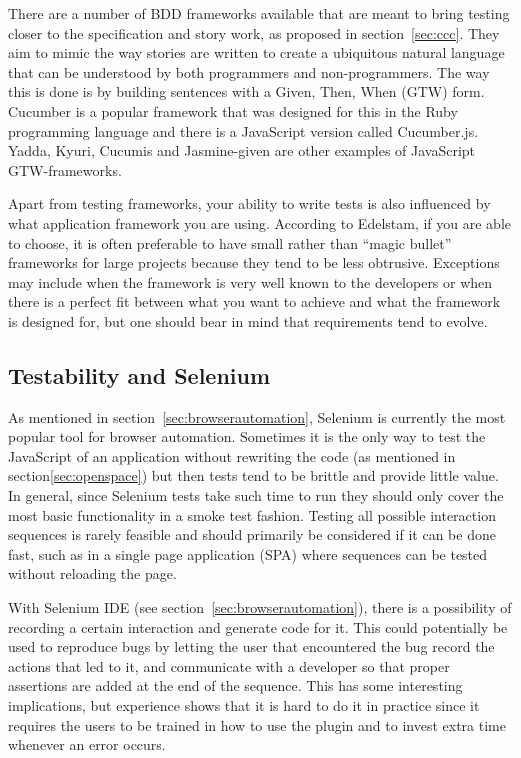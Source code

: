 \documentclass[11pt]{article}
\begin{document}
There are a number of BDD frameworks available that are meant to bring testing closer to the specification and story work, as proposed in section~\ref{sec:ccc}. They aim to mimic the way stories are written to create a ubiquitous natural language that can be understood by both programmers and non-programmers. The way this is done is by building sentences with a Given, Then, When (GTW) form. Cucumber is a popular framework that was designed for this in the Ruby programming language and there is a JavaScript version called Cucumber.js. Yadda, Kyuri, Cucumis and Jasmine-given are other examples of JavaScript GTW-frameworks. \cite[section 8.4]{BDDJS}\cite{Cucumis}

Apart from testing frameworks, your ability to write tests is also influenced by what application framework you are using. According to Edelstam, if you are able to choose, it is often preferable to have small rather than ``magic bullet'' frameworks for large projects because they tend to be less obtrusive. Exceptions may include when the framework is very well known to the developers or when there is a perfect fit between what you want to achieve and what the framework is designed for, but one should bear in mind that requirements tend to evolve. \cite[questions~48-50]{Edelstam}

\subsection{Testability and Selenium}

As mentioned in section~\ref{sec:browserautomation}, Selenium is currently the most popular tool for browser automation. Sometimes it is the only way to test the JavaScript of an application without rewriting the code (as mentioned in section\ref{sec:openspace}) but then tests tend to be brittle and provide little value. In general, since Selenium tests take such time to run they should only cover the most basic functionality in a smoke test fashion. Testing all possible interaction sequences is rarely feasible and should primarily be considered if it can be done fast, such as in a single page application (SPA) where sequences can be tested without reloading the page. \cite[question~44]{Edelstam}

With Selenium IDE (see section~\ref{sec:browserautomation}), there is a possibility of recording a certain interaction and generate code for it. This could potentially be used to reproduce bugs by letting the user that encountered the bug record the actions that led to it, and communicate with a developer so that proper assertions are added at the end of the sequence. This has some interesting implications, but experience shows that it is hard to do it in practice since it requires the users to be trained in how to use the plugin and to invest extra time whenever an error occurs. \cite[questions~42-43]{Edelstam}
\end{document}
